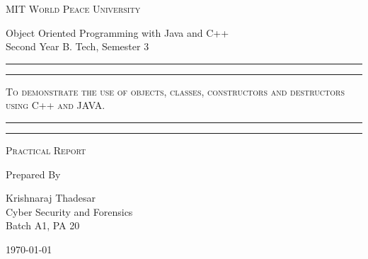 \documentclass[11pt]{article}
\begin{document}
	
	\begin{titlepage} 
		\centering 
		
		
		\huge\textsc{
			MIT World Peace University
		}\\
	
		\vspace{0.75\baselineskip} %
		
		\LARGE{
			Object Oriented Programming with Java and C++\\
			Second Year B. Tech, Semester 3
		}
		
		\vfill %
		
		
		\rule{\textwidth}{1.6pt}\vspace*{-\baselineskip}\vspace*{2pt}
		\rule{\textwidth}{0.6pt}
		\vspace{0.75\baselineskip} %
		
		
		
		\huge{\textsc{
			To demonstrate the use of objects, classes, constructors and destructors using C++ and JAVA.
			}} \\
		
		
		
		\vspace{0.5\baselineskip} %
		\rule{\textwidth}{0.6pt}\vspace*{-\baselineskip}\vspace*{2.8pt}
		\rule{\textwidth}{1.6pt}
		
		\vspace{1\baselineskip} %

			
		\LARGE\textsc{
			Practical Report
		} %
		\vfill
		
		
		Prepared By
		\vspace{0.5\baselineskip} %
		
		\Large{
			Krishnaraj Thadesar \\
			Cyber Security and Forensics\\
			Batch A1, PA 20
		}
		
		
		\vspace{0.5\baselineskip} %
		\today

	\end{titlepage}
	
\end{document}
